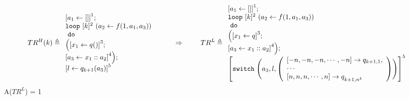 \documentclass[a4paper,11pt]{article}
\begin{document}
%
%
\begin{example}
\[
TR^H(k) \triangleq
{
\begin{array}{l}
    \clabel{a_1 \leftarrow [] }^1; \\
    \eloop ~ [k]^{2} ~ (a_2 \leftarrow f(1, a_1, a_3)) \\
    ~ \edo ~ \\
    \Big(
     \clabel{x_1 \leftarrow q() }^3 ; \\
    \clabel{a_3 \leftarrow x_1 :: a_2 }^4     \Big);\\
    \clabel{l \leftarrow q_{k + 1}(a_3)}^{5}\\
\end{array}
}
%
~~~~~~~~ \Rightarrow ~~~~~~~
%
TR^L \triangleq
\begin{array}{l}
    \left[a_1 \leftarrow [] \right]^1; \\
   \eloop ~ [k]^{2} ~ (a_2 \leftarrow f(1, a_1, a_3)) \\
    ~ \edo ~ \\
   \Big( 
     \left[x_1 \leftarrow q \right]^3; \\
    \left[a_3 \leftarrow x_1 :: a_2 \right]^4 
    \Big);\\
    \clabel{
\eswitch \Bigg(a_3, l, 
    \left(\begin{array}{l}
    \left[-n, -n, -n, \cdots, -n\right] \to q_{k + 1,1},\\
    \cdots\\
    \left[n, n, n, \cdots, n\right] \to q^{}_{k + 1, n^k}
\end{array} \right) \Bigg)
    }^5
\end{array}
\]
A($TR^L$) = 1


\end{example}
\end{document}
